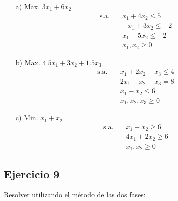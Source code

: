 \begin{itemize}
    \item[a)] Max. $3x_1 + 6x_2$
    \begin{align*}
        \text{s.a.} \quad & x_1 + 4x_2 \leq 5 \\
        & -x_1 + 3x_2 \leq -2 \\
        & x_1 - 5x_2 \leq -2 \\
        & x_1, x_2 \geq 0
    \end{align*}
    
    \item[b)] Max. $4.5x_1 + 3x_2 + 1.5x_3$
    \begin{align*}
        \text{s.a.} \quad & x_1 + 2x_2 - x_3 \leq 4 \\
        & 2x_1 - x_2 + x_3 = 8 \\
        & x_1 - x_2 \leq 6 \\
        & x_1, x_2, x_3 \geq 0
    \end{align*}
    
    \item[c)] Min. $x_1 + x_2$
    \begin{align*}
        \text{s.a.} \quad & x_1 + x_2 \geq 6 \\
        & 4x_1 + 2x_2 \geq 6 \\
        & x_1, x_2 \geq 0
    \end{align*}
\end{itemize}


\subsection*{Ejercicio 9}

Resolver utilizando el método de las dos fases:

